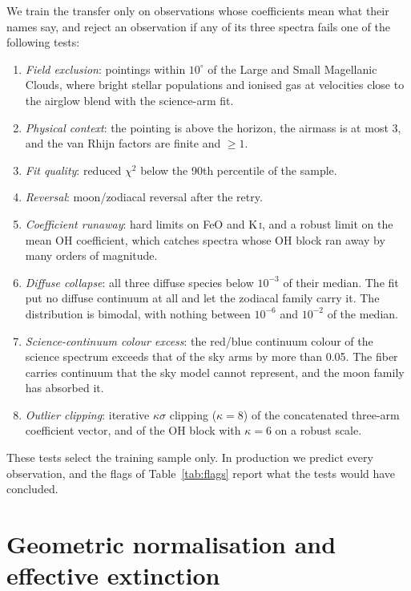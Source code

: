 We train the transfer only on observations whose coefficients mean what their
names say, and reject an observation if any of its three spectra fails one
of the following tests:
\begin{enumerate}
  \item \emph{Field exclusion}: pointings within $10^\circ$ of the Large and
        Small Magellanic Clouds, where bright stellar populations and ionised
        gas at velocities close to the airglow blend with the science-arm
        fit.
  \item \emph{Physical context}: the pointing is above the horizon, the
        airmass is at most 3, and the van Rhijn factors are finite and
        $\ge1$.
  \item \emph{Fit quality}: reduced $\chi^2$ below the 90th percentile of
        the sample.
  \item \emph{Reversal}: moon/zodiacal reversal after the retry.
  \item \emph{Coefficient runaway}: hard limits on FeO and K\,\textsc{i},
        and a robust limit on the mean OH coefficient, which catches
        spectra whose OH block ran away by many orders of magnitude.
  \item \emph{Diffuse collapse}: all three diffuse species below $10^{-3}$
        of their median. The fit put no diffuse continuum at all and let the
        zodiacal family carry it. The distribution is bimodal, with nothing
        between $10^{-6}$ and $10^{-2}$ of the median.
  \item \emph{Science-continuum colour excess}: the red/blue continuum colour
        of the science spectrum exceeds that of the sky arms by more than
        0.05. The fiber carries continuum that the sky model cannot
        represent, and the moon family has absorbed it.
  \item \emph{Outlier clipping}: iterative $\kappa\sigma$ clipping
        ($\kappa = 8$) of the concatenated three-arm coefficient vector, and
        of the OH block with $\kappa = 6$ on a robust scale.
\end{enumerate}
These tests select the training sample only. In production we predict every
observation, and the flags of Table~\ref{tab:flags} report what the tests
would have concluded.

\section{Geometric normalisation and effective extinction}
\label{sec:geometry}

